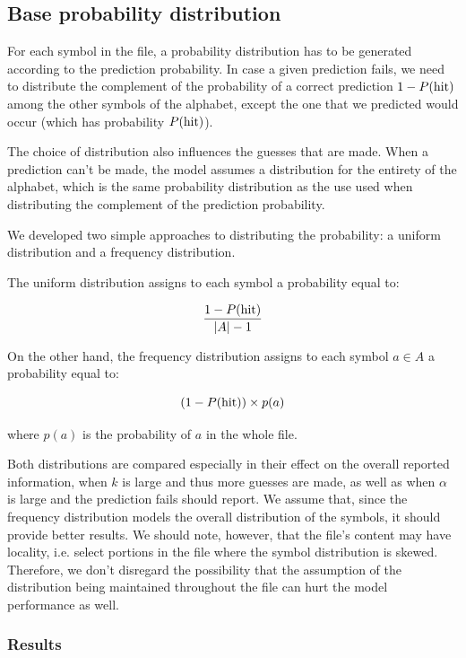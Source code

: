 \documentclass{article}
\begin{document}
\subsection{Base probability distribution}

For each symbol in the file, a probability distribution has to be generated according to the prediction probability.
In case a given prediction fails, we need to distribute the complement of the probability of a correct prediction $1 - P(\textnormal{hit})$ among the other symbols of the alphabet, except the one that we predicted would occur (which has probability $P(\textnormal{hit})$).

The choice of distribution also influences the guesses that are made.
When a prediction can't be made, the model assumes a distribution for the entirety of the alphabet, which is the same probability distribution as the use used when distributing the complement of the prediction probability.

We developed two simple approaches to distributing the probability: a uniform distribution and a frequency distribution.

The uniform distribution assigns to each symbol a probability equal to:

$$
\frac{1 - P(\textnormal{hit})}{\vert A \vert - 1}
$$

On the other hand, the frequency distribution assigns to each symbol $a \in A$ a probability equal to:

$$
(1 - P(\textnormal{hit})) \times p(a)
$$

where $p(a)$ is the probability of $a$ in the whole file.

Both distributions are compared especially in their effect on the overall reported information, when $k$ is large and thus more guesses are made, as well as when $\alpha$ is large and the prediction fails should report.
We assume that, since the frequency distribution models the overall distribution of the symbols, it should provide better results.
We should note, however, that the file's content may have locality, i.e. select portions in the file where the symbol distribution is skewed.
Therefore, we don't disregard the possibility that the assumption of the distribution being maintained throughout the file can hurt the model performance as well.

\subsubsection{Results}
\end{document}
